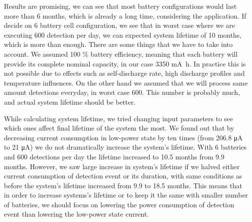 Results are promising, we can see that most battery configurations would last more than 6 months, which is already a long time, considering the application.
If decide on 6 battery cell configuration, we see that in worst case where we are executing 600 detection per day, we can expected system lifetime of 10 months, which is more than enough.
There are some things that we have to take into account.
We assumed 100 \% battery efficiency, meaning that each battery will provide its complete nominal capacity, in our case 3350 \si{\milli\ampere\hour}.
In practice this is not possible due to effects such as self-discharge rate, high discharge profiles and temperature influences.
On the other hand we assumed that we will process same amount detections everyday, in worst case 600.
This number is probably much, and actual system lifetime should be better.

While calculating system lifetime, we tried changing input parameters to see which ones affect final lifetime of the system the most.
We found out that by decreasing current consumption in low-power state by ten times (from 206.8 \si{\micro\ampere} to 21 \si{\micro\ampere}) we do not dramatically increase the system's lifetime.
With 6 batteries and 600 detections per day the lifetime increased to 10.5 months from 9.9 months.
However, we saw large increase in system's lifetime if we halved either current consumption of detection event or its duration, with same conditions as before the system's lifetime increased from 9.9 to 18.5 months.
This means that in order to increase systems's lifetime or to keep it the same with smaller number of batteries, we should focus on lowering the power consumption of detection event than lowering the low-power state current.


